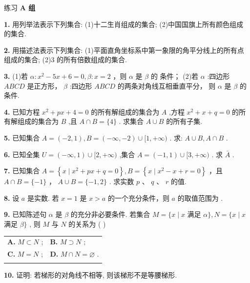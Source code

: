 \documentclass[a4paper,10pt,oneside,fontset=none]{ctexbook}
\newcommand{\fillin}[1][2cm]{\,\underline{\hspace{#1}}\,}
\newenvironment{exercise}[1][]{\begin{exBox}{练习}{#1}}{\end{exBox}}
\numberwithin{equation}{chapter}
\begin{document}
\begin{exercise}
\textbf{A 组}\par\vspace{0.5em}
\textbf{1.} 用列举法表示下列集合: (1)十二生肖组成的集合; (2)中国国旗上所有颜色组成的集合.
\par\vspace{0.8em}
\textbf{2.} 用描述法表示下列集合: (1)平面直角坐标系中第一象限的角平分线上的所有点组成的集合; (2)3 的所有倍数组成的集合.
\par\vspace{0.8em}
\textbf{3.} (1)若 $\alpha  : {x}^{2} - {5x} + 6 = 0,\beta  : x = 2$ ，则 $\alpha$ 是 $\beta$ 的\fillin[2cm]条件； (2)若 $\alpha$ :四边形 ${ABCD}$ 是正方形， $\beta$ :四边形 ${ABCD}$ 的两条对角线互相垂直平分， 则 $\alpha$ 是 $\beta$ 的\fillin[2cm]条件.
\par\vspace{0.8em}
\textbf{4.} 已知方程 ${x}^{2} + {px} + 4 = 0$ 的所有解组成的集合为 $A$ ,方程 ${x}^{2} + x + q = 0$ 的所有解组成的集合为 $B$ ,且 $A \cap  B = \{ 4\}$ . 求集合 $A \cup  B$ 的所有子集.
\par\vspace{0.8em}
\textbf{5.} 已知集合 $A = \left( {-2,1}\right) , B = \left( {-\infty , - 2}\right)  \cup  \lbrack 1, + \infty )$ . 求: $A \cup  B, A \cap  B$ .
\par\vspace{0.8em}
\textbf{6.} 已知全集 $U = \left( {-\infty ,1}\right)  \cup  \lbrack 2, + \infty )$ ,集合 $A = \left( {-1,1}\right)  \cup  \lbrack 3, + \infty )$ . 求 $\bar{A}$ .
\par\vspace{0.8em}
\textbf{7.} 已知集合 $A = \left\{  {x \mid  {x}^{2} + {px} + q = 0}\right\}  , B = \left\{  {x \mid  {x}^{2} - x + r = 0}\right\}$ ，且 $A \cap  B = \{  - 1\}$ ， $A \cup  B = \{  - 1,2\}$ . 求实数 $p\text{ 、 }q\text{ 、 }r$ 的值.
\par\vspace{0.8em}
\textbf{8.} 设 $a$ 是实数. 若 $x = 1$ 是 $x > a$ 的一个充分条件，则 $a$ 的取值范围为\fillin[2cm].
\par\vspace{0.8em}
\textbf{9.} 已知陈述句 $\alpha$ 是 $\beta$ 的充分非必要条件. 若集合 $M = \{ x \mid  x$ 满足 $\alpha \} , N = \{ x \mid  x$ 满足 $\beta \}$ , 则 $M$ 与 $N$ 的关系为 ( )
\par\vspace{0.3em}
\begin{center}
\begin{tabular}{@{}p{}p{}@{}}
\textbf{A.} $M \subset  N$ ; & \textbf{B.} $M \supset  N$ ; \\\vspace{0.2em}
\textbf{C.} $M = N$ ; & \textbf{D.} $M \cap  N = \varnothing$ . \\\vspace{0.2em}
\end{tabular}
\end{center}
\par\vspace{0.8em}
\textbf{10.} 证明: 若梯形的对角线不相等, 则该梯形不是等腰梯形.
\end{exercise}
\end{document}
